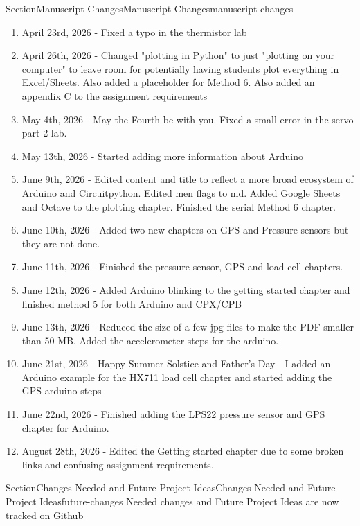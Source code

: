 \documentclass[oneside,10pt,]{book}
\newcommand{\linkhilite}[1]{\underline{#1}}
\numberwithin{equation}{section}
\begin{document}
\begin{sectionptx}{Section}{Manuscript Changes}{}{Manuscript Changes}{}{}{manuscript-changes}
\begin{enumerate}
\item{}April 23rd, 2026 - Fixed a typo in the thermistor lab%
\item{}April 26th, 2026 - Changed "plotting in Python" to just "plotting on your computer" to leave room for potentially having students plot everything in Excel\slash{}Sheets. Also added a placeholder for Method 6. Also added an appendix C to the assignment requirements%
\item{}May 4th, 2026 - May the Fourth be with you. Fixed a small error in the servo part 2 lab.%
\item{}May 13th, 2026 - Started adding more information about Arduino%
\item{}June 9th, 2026 - Edited content and title to reflect a more broad ecosystem of Arduino and Circuitpython. Edited men flags to md. Added Google Sheets and Octave to the plotting chapter. Finished the serial Method 6 chapter.%
\item{}June 10th, 2026 - Added two new chapters on GPS and Pressure sensors but they are not done.%
\item{}June 11th, 2026 - Finished the pressure sensor, GPS and load cell chapters.%
\item{}June 12th, 2026 - Added Arduino blinking to the getting started chapter and finished method 5 for both Arduino and CPX\slash{}CPB%
\item{}June 13th, 2026 - Reduced the size of a few jpg files to make the PDF smaller than 50 MB. Added the accelerometer steps for the arduino.%
\item{}June 21st, 2026 - Happy Summer Solstice and Father's Day - I added an Arduino example for the HX711 load cell chapter and started adding the GPS arduino steps%
\item{}June 22nd, 2026 - Finished adding the LPS22 pressure sensor and GPS chapter for Arduino.%
\item{}August 28th, 2026 - Edited the Getting started chapter due to some broken links and confusing assignment requirements.%
\end{enumerate}
%
\end{sectionptx}
%
%
\typeout{************************************************}
\typeout{************************************************}
%
\begin{sectionptx}{Section}{Changes Needed and Future Project Ideas}{}{Changes Needed and Future Project Ideas}{}{}{future-changes}
Needed changes and Future Project Ideas are now tracked on \href{https://github.com/cmontalvo251/project-based-instrumentation/issues}{\linkhilite{Github}}%
\end{sectionptx}
\end{document}
